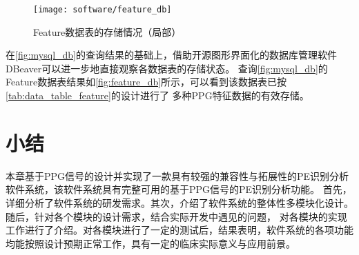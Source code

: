 \begin{figure}[htbp]
    \centering
    \texttt{[image: software/feature\_db]}
    \caption[Feature数据表的存储情况（局部）]{\label{fig:feature_db}Feature数据表的存储情况（局部）}
\end{figure}

在\autoref{fig:mysql_db}的查询结果的基础上，借助开源图形界面化的数据库管理软件DBeaver可以进一步地直接观察各数据表的存储状态。
查询\autoref{fig:mysql_db}的Feature数据表结果如\autoref{fig:feature_db}所示，可以看到该数据表已按\autoref{tab:data_table_feature}的设计进行了
多种PPG特征数据的有效存储。

\section{小结}
本章基于PPG信号的设计并实现了一款具有较强的兼容性与拓展性的PE识别分析软件系统，该软件系统具有完整可用的基于PPG信号的PE识别分析功能。
首先，详细分析了软件系统的研发需求。其次，介绍了软件系统的整体性多模块化设计。随后，针对各个模块的设计需求，结合实际开发中遇见的问题，
对各模块的实现工作进行了介绍。对各模块进行了一定的测试后，结果表明，软件系统的各项功能均能按照设计预期正常工作，具有一定的临床实际意义与应用前景。